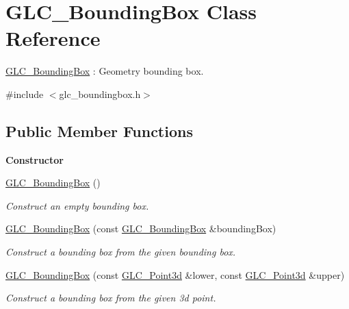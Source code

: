 \hypertarget{class_g_l_c___bounding_box}{\section{G\-L\-C\-\_\-\-Bounding\-Box Class Reference}
\label{class_g_l_c___bounding_box}
}


\hyperlink{class_g_l_c___bounding_box}{G\-L\-C\-\_\-\-Bounding\-Box} \-: Geometry bounding box.  




{\ttfamily \#include $<$glc\-\_\-boundingbox.\-h$>$}

\subsection*{Public Member Functions}
\begin{Indent}{\bf Constructor}\par
\begin{DoxyCompactItemize}
\item 
\hyperlink{class_g_l_c___bounding_box_a799c7e4424ffc84f68bff498df6e1658}{G\-L\-C\-\_\-\-Bounding\-Box} ()
\begin{DoxyCompactList}\small\item\em Construct an empty bounding box. \end{DoxyCompactList}\item 
\hyperlink{class_g_l_c___bounding_box_a6e60d8477aab4632f76e02a2b99f1600}{G\-L\-C\-\_\-\-Bounding\-Box} (const \hyperlink{class_g_l_c___bounding_box}{G\-L\-C\-\_\-\-Bounding\-Box} \&bounding\-Box)
\begin{DoxyCompactList}\small\item\em Construct a bounding box from the given bounding box. \end{DoxyCompactList}\item 
\hyperlink{class_g_l_c___bounding_box_a36c4e30e5d0e960172f3263a66b90fb1}{G\-L\-C\-\_\-\-Bounding\-Box} (const \hyperlink{glc__vector3d_8h_a4e13a9bbc7ab3d34de7e98b41836772c}{G\-L\-C\-\_\-\-Point3d} \&lower, const \hyperlink{glc__vector3d_8h_a4e13a9bbc7ab3d34de7e98b41836772c}{G\-L\-C\-\_\-\-Point3d} \&upper)
\begin{DoxyCompactList}\small\item\em Construct a bounding box from the given 3d point. \end{DoxyCompactList}\end{DoxyCompactItemize}
\end{Indent}
